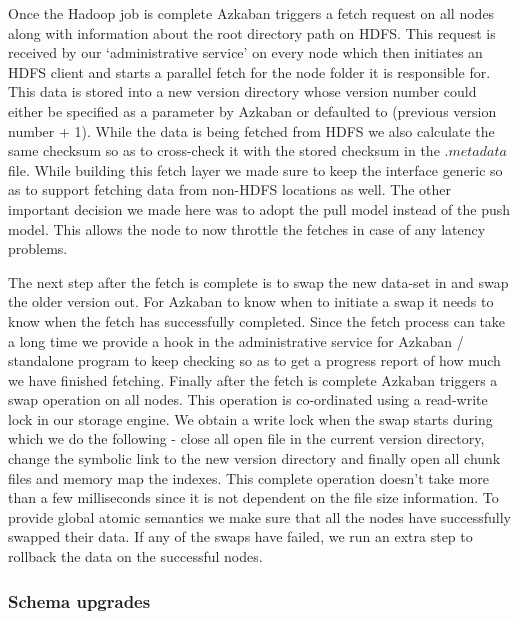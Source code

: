 \documentclass[10pt,twocolumn,preprint,nonatbib,numbers]{sigplanconf}
\begin{document}
Once the Hadoop job is complete Azkaban triggers a fetch request on all \projectname{} nodes along with information about the root directory path on HDFS. This request is received by our `administrative service' on every node which then initiates an HDFS client and starts a parallel fetch for the node folder it is responsible for. This data is stored into a new version directory whose version number could either be specified as a parameter by Azkaban or defaulted to (previous version number + 1). While the data is being fetched from HDFS we also calculate the same checksum so as to cross-check it with the stored checksum in the $.metadata$ file. While building this fetch layer we made sure to keep the interface generic so as to support fetching data from non-HDFS locations as well. The other important decision we made here was to adopt the pull model instead of the push model. This allows the \projectname{} node to now throttle the fetches in case of any latency problems. 

The next step after the fetch is complete is to swap the new data-set in and swap the older version out. For Azkaban to know when to initiate a swap it needs to know when the fetch has successfully completed. Since the fetch process can take a long time we provide a hook in the administrative service for Azkaban / standalone program to keep checking so as to get a progress report of how much we have finished fetching. Finally after the fetch is complete Azkaban triggers a swap operation on all nodes. This operation is co-ordinated using a read-write lock in our storage engine. We obtain a write lock when the swap starts during which we do the following - close all open file in the current version directory, change the symbolic link to the new version directory and finally open all chunk files and memory map the indexes. This complete operation doesn't take more than a few milliseconds since it is not dependent on the file size information. To provide global atomic semantics we make sure that all the nodes have successfully swapped their data. If any of the swaps have failed, we run an extra step to rollback the data on the successful nodes.



\subsubsection{Schema upgrades}
\label{sec:read_only:data_cycle:schema_upgrades}
\end{document}
